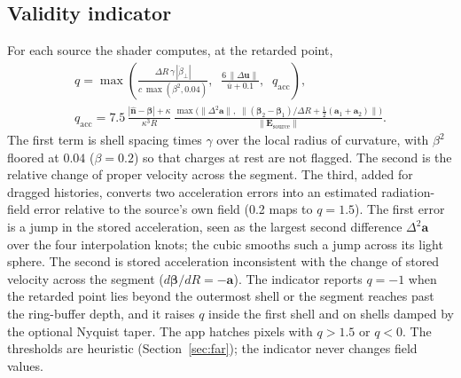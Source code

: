 \documentclass[11pt, a4paper]{article}
\begin{document}
\subsection{Validity indicator}\label{sec:validity}
For each source the shader computes, at the retarded point,
\begin{gather*}
q = \max\!\left(\frac{\Delta R\,\gamma\,|\dot{\beta}_\perp|}{c\,\max(\beta^2, 0.04)},\;\; \frac{6\,\|\Delta\mathbf{u}\|}{\bar{u} + 0.1},\;\; q_{\text{acc}}\right), \\
q_{\text{acc}} = 7.5\,\frac{|\hat{\mathbf{n}} - \boldsymbol{\beta}| + \kappa}{\kappa^3 R}\,\frac{\max\big(\|\Delta^2\mathbf{a}\|,\; \|(\boldsymbol{\beta}_2 - \boldsymbol{\beta}_1)/\Delta R + \tfrac12(\mathbf{a}_1 + \mathbf{a}_2)\|\big)}{\|\mathbf{E}_{\text{source}}\|}.
\end{gather*}
The first term is shell spacing times $\gamma$ over the local radius of curvature, with $\beta^2$ floored at $0.04$ ($\beta = 0.2$) so that charges at rest are not flagged. The second is the relative change of proper velocity across the segment. The third, added for dragged histories, converts two acceleration errors into an estimated radiation-field error relative to the source's own field (0.2 maps to $q = 1.5$). The first error is a jump in the stored acceleration, seen as the largest second difference $\Delta^2\mathbf{a}$ over the four interpolation knots; the cubic smooths such a jump across its light sphere. The second is stored acceleration inconsistent with the change of stored velocity across the segment ($d\boldsymbol{\beta}/dR = -\mathbf{a}$). The indicator reports $q = -1$ when the retarded point lies beyond the outermost shell or the segment reaches past the ring-buffer depth, and it raises $q$ inside the first shell and on shells damped by the optional Nyquist taper. The app hatches pixels with $q > 1.5$ or $q < 0$. The thresholds are heuristic (Section~\ref{sec:far}); the indicator never changes field values.
\end{document}
